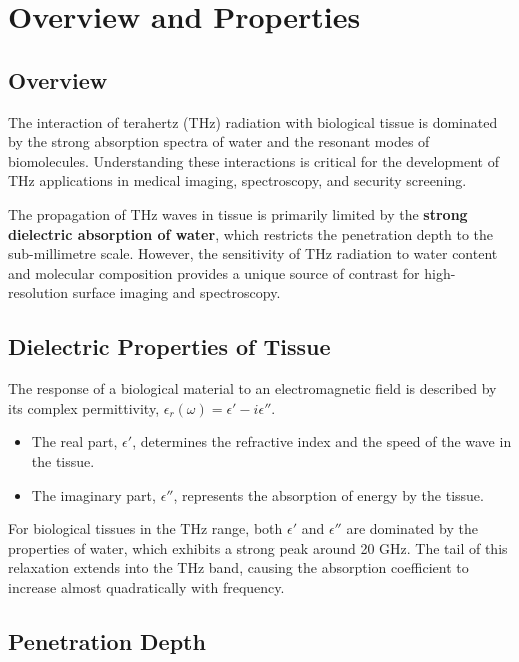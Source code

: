 \section{Overview and Properties}

\subsection{Overview}

The interaction of terahertz (THz) radiation with biological tissue is dominated by the strong absorption spectra of water and the resonant modes of biomolecules. Understanding these interactions is critical for the development of THz applications in medical imaging, spectroscopy, and security screening.

\begin{keyconcept}
    The propagation of THz waves in tissue is primarily limited by the \textbf{strong dielectric absorption of water}, which restricts the penetration depth to the sub-millimetre scale. However, the sensitivity of THz radiation to water content and molecular composition provides a unique source of contrast for high-resolution surface imaging and spectroscopy.
\end{keyconcept}


\subsection{Dielectric Properties of Tissue}

The response of a biological material to an electromagnetic field is described by its complex permittivity, $\epsilon_r(\omega) = \epsilon' - i\epsilon''$.
\begin{itemize}
    \item The real part, $\epsilon'$, determines the refractive index and the speed of the wave in the tissue.
    \item The imaginary part, $\epsilon''$, represents the absorption of energy by the tissue.
\end{itemize}
For biological tissues in the THz range, both $\epsilon'$ and $\epsilon''$ are dominated by the properties of water, which exhibits a strong  peak around 20 GHz. The tail of this relaxation extends into the THz band, causing the absorption coefficient to increase almost quadratically with frequency.


\subsection{Penetration Depth}

